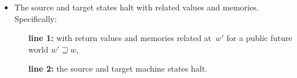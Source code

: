 \begin{itemize}
\begin{itemize}[leftmargin=11mm]
  \end{itemize}
  \vskip 1mm
\item {} The source and target states halt with related values and memories.
  Specifically:
  \begin{itemize}[leftmargin=11mm]
  \item[\textbf{line 1:}] with return values and memories related at~$w'$
    for a public future world $w' \sqsupseteq w$,
  \item[\textbf{line 2:}] the source and target machine states halt.
  \end{itemize}
\end{itemize}



